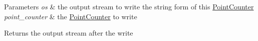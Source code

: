 \begin{DoxyParams}{Parameters}
{\em os} & the output stream to write the string form of this \hyperlink{structcvdi_1_1PointCounter}{Point\+Counter} \\
\hline
{\em point\+\_\+counter} & the \hyperlink{structcvdi_1_1PointCounter}{Point\+Counter} to write \\
\hline
\end{DoxyParams}
\begin{DoxyReturn}{Returns}
the output stream after the write 
\end{DoxyReturn}
